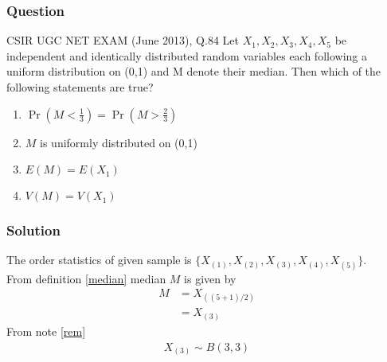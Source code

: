 \documentclass{beamer}
\providecommand{\pr}[1]{\ensuremath{\Pr\left(#1\right)}}
\begin{document}
\begin{frame}
\frametitle{Question}
\begin{block}{CSIR UGC NET EXAM (June 2013), Q.84}
Let $X_1,X_2,X_3,X_4,X_5$ be independent and identically distributed random variables each following a uniform distribution on (0,1) and M denote their median. Then which of the following statements are true?
\begin{enumerate}
    \item $\pr{M<\frac{1}{3}}=\pr{M>\frac{2}{3}}$\\
    \item $M$ is uniformly distributed on (0,1)\\
    \item $E(M)=E(X_1)$\\
    \item $V(M)=V(X_1)$
\end{enumerate}
\end{block}
\end{frame}

\begin{frame}
\frametitle{Solution}
The order statistics of given sample is $\{X_{(1)},X_{(2)},X_{(3)},X_{(4)},X_{(5)}\}$.\\
From definition \eqref{median} median $M$ is given by
\begin{align}
  M &= X_{((5+1)/2)}\\
  &=X_{(3)}\label{eq:m}
\end{align}
From note \eqref{rem} 
\begin{align}
X_{(3)} \sim B(3,3)
\end{align}
 \end{frame}
\end{document}

